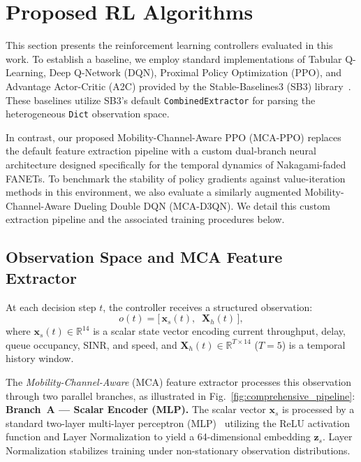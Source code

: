 
\section{Proposed RL Algorithms}
\label{sec:algorithms}

This section presents the reinforcement learning controllers evaluated in this work. To establish a baseline, we employ standard implementations of Tabular Q-Learning, Deep Q-Network (DQN), Proximal Policy Optimization (PPO), and Advantage Actor-Critic (A2C) provided by the Stable-Baselines3 (SB3) library~\cite{raffin2021sb3}. These baselines utilize SB3's default \texttt{CombinedExtractor} for parsing the heterogeneous \texttt{Dict} observation space.

In contrast, our proposed Mobility-Channel-Aware PPO (MCA-PPO) replaces the default feature extraction pipeline with a custom dual-branch neural architecture designed specifically for the temporal dynamics of Nakagami-faded FANETs. To benchmark the stability of policy gradients against value-iteration methods in this environment, we also evaluate a similarly augmented Mobility-Channel-Aware Dueling Double DQN (MCA-D3QN). We detail this custom extraction pipeline and the associated training procedures below.

\subsection{Observation Space and MCA Feature Extractor}
\label{sec:mca_extractor}

At each decision step $t$, the controller receives a structured observation:
\begin{equation}
    o(t) = \big[\,\mathbf{x}_s(t),\;\; \mathbf{X}_h(t)\,\big],
    \label{eq:obs}
\end{equation}
where $\mathbf{x}_s(t) \in \mathbb{R}^{14}$ is a scalar state vector encoding current throughput, delay, queue occupancy, SINR, and speed, and $\mathbf{X}_h(t) \in \mathbb{R}^{T \times 14}$ ($T = 5$) is a temporal history window. 

The \emph{Mobility-Channel-Aware} (MCA) feature extractor processes this observation through two parallel branches, as illustrated in Fig.~\ref{fig:comprehensive_pipeline}:
\textbf{Branch~A --- Scalar Encoder (MLP).}
The scalar vector $\mathbf{x}_s$ is processed by a standard two-layer multi-layer perceptron (MLP)~\cite{goodfellow2016deep} utilizing the ReLU activation function and Layer Normalization to yield a 64-dimensional embedding $\mathbf{z}_s$. Layer Normalization stabilizes training under non-stationary observation distributions.

